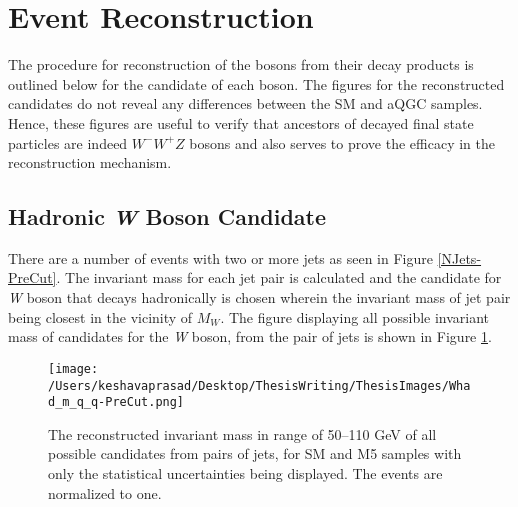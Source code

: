 \section{Event Reconstruction}\label{Event Reconstruction}
The procedure for reconstruction of the bosons from their decay products is outlined below for the candidate of each boson. The figures for the reconstructed candidates do not reveal any differences between the SM and aQGC samples. Hence, these figures are useful to verify that ancestors of decayed final state particles are indeed $W^{-}W^{+}Z$ bosons and also serves to prove the efficacy in the reconstruction mechanism.

\subsection{Hadronic \textit{W} Boson Candidate}
There are a number of events with two or more jets as seen in Figure \ref{NJets-PreCut}. The invariant mass for each jet pair is calculated and the candidate for \textit{W} boson that decays hadronically is chosen wherein the invariant mass of jet pair being closest in the vicinity of \texttt{$M_{W}$}. The figure displaying all possible invariant mass of candidates for the \textit{W} boson, from the pair of jets is shown in Figure  \ref{Had candidate-PreCut}.

\begin{figure}[!htb]%
	\centering
	\texttt{[image: /Users/keshavaprasad/Desktop/ThesisWriting/ThesisImages/Whad\_m\_q\_q-PreCut.png]}
	\caption{The reconstructed invariant mass in range of \numrange[range-phrase = --]{50}{110} GeV of all possible candidates from pairs of jets, for SM and M5 samples with only the statistical uncertainties being displayed. The events are normalized to one.}
	\label{Had candidate-PreCut}
\end{figure}

